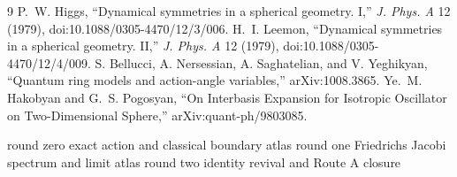 \documentclass[10pt]{article}
\begin{document}
\begin{thebibliography}{9}
 P.~W. Higgs, ``Dynamical symmetries in a spherical geometry.
I,'' \emph{J. Phys. A} 12 (1979), doi:10.1088/0305-4470/12/3/006.
 H.~I. Leemon, ``Dynamical symmetries in a spherical
geometry. II,'' \emph{J. Phys. A} 12 (1979),
doi:10.1088/0305-4470/12/4/009.
 S. Bellucci, A. Nersessian, A. Saghatelian, and V. Yeghikyan,
``Quantum ring models and action-angle variables,'' arXiv:1008.3865.
 Ye.~M. Hakobyan and G.~S. Pogosyan, ``On Interbasis Expansion
for Isotropic Oscillator on Two-Dimensional Sphere,'' arXiv:quant-ph/9803085.
\end{thebibliography}

\bigskip
\begin{center}\small\sffamily
\ifcase\CRevisionRound
round zero exact action and classical boundary atlas
\or
round one Friedrichs Jacobi spectrum and limit atlas
\or
round two identity revival and Route A closure
\fi
\end{center}
\end{document}
